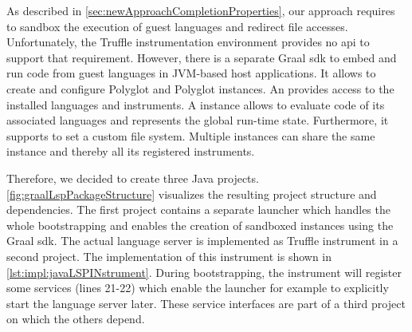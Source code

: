         As described in \autoref{sec:newApproachCompletionProperties}, our approach requires to sandbox the execution of guest languages and redirect file accesses. Unfortunately, the Truffle instrumentation environment provides no \ac{api} to support that requirement. However, there is a separate Graal \ac{sdk} to embed and run code from guest languages in JVM-based host applications. It allows to create and configure Polyglot  and Polyglot  instances. An  provides access to the installed languages and instruments. A  instance allows to evaluate code of its associated languages and represents the global run-time state. Furthermore, it supports to set a custom file system. Multiple  instances can share the same  instance and thereby all its registered instruments.
        
        Therefore, we decided to create three Java projects. \autoref{fig:graalLspPackageStructure} visualizes the resulting project structure and dependencies. The first project contains a separate launcher which handles the whole bootstrapping and enables the creation of sandboxed  instances using the Graal \ac{sdk}. The actual language server is implemented as Truffle instrument in a second project. The implementation of this instrument is shown in \autoref{lst:impl:javaLSPINstrument}. During bootstrapping, the instrument will register some services (lines 21-22) which enable the launcher for example to explicitly start the language server later. These service interfaces are part of a third project on which the others depend. 

